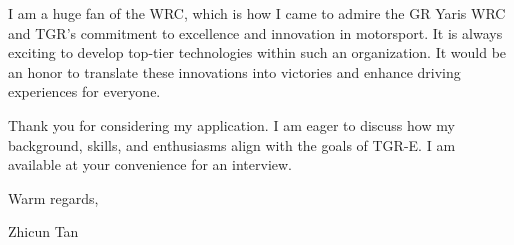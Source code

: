 \documentclass[a4paper,11pt]{article}
\begin{document}
\bigskip

I am a huge fan of the WRC, which is how I came to admire the GR Yaris WRC and TGR's commitment to excellence and innovation in motorsport. It is always exciting to develop top-tier technologies within such an organization. It would be an honor to translate these innovations into victories and enhance driving experiences for everyone.

\bigskip

Thank you for considering my application. I am eager to discuss how my background, skills, and enthusiasms align with the goals of TGR-E. I am available at your convenience for an interview.


\bigskip

Warm regards,

\bigskip

Zhicun Tan
\end{document}
